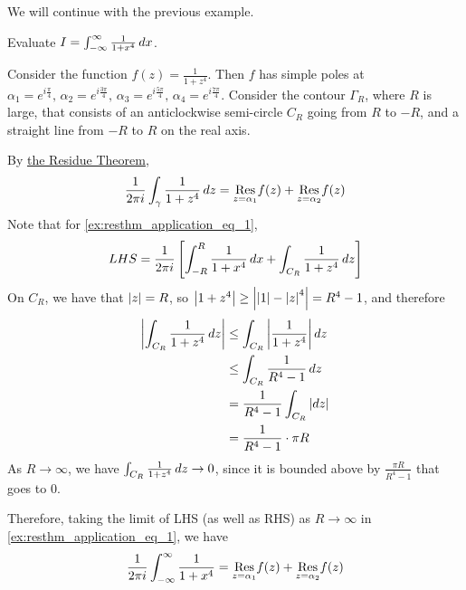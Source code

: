 \documentclass[notoc,notitlepage]{tufte-book}
\begin{document}
We will continue with the previous example.

\begin{ex}
  Evaluate $I = \int_{-\infty}^{\infty} \frac{1}{1 + x^4} \dif{x}$.

  Consider the function $f(z) = \frac{1}{1 + z^4}$. Then $f$ has simple poles at $\alpha_1 = e^{i \frac{\pi}{4} }, \, \alpha_2 = e^{i \frac{3 \pi}{4} }, \, \alpha_3 = e^{i \frac{5 \pi}{4} }, \, \alpha_4 = e^{i \frac{7 \pi}{4} }$. Consider the contour $\Gamma_R$, where $R$ is large, that consists of an anticlockwise semi-circle $C_R$ going from $R$ to $-R$, and a straight line from $-R$ to $R$ on the real axis.

  By \hyperref[thm:cauchy_s_residue_theorem_generalized]{the Residue Theorem},
  \begin{equation}\label{ex:resthm_application_eq_1}
    \frac{1}{2 \pi i} \int_{\gamma} \frac{1}{1 + z^4} \dif{z} = \res{f(z)}{z = \alpha_1} + \res{f(z)}{z = \alpha_2}
  \end{equation}
  Note that for \cref{ex:resthm_application_eq_1},
  \begin{equation*}
    LHS = \frac{1}{2 \pi i} \left[ \int_{-R}^{R} \frac{1}{1 + x^4} \dif{x} + \int_{C_R} \frac{1}{1 + z^4} \dif{z} \right] 
  \end{equation*}
  On $C_R$, we have that $\abs{z} = R$, so $\abs{1 + z^4} \geq \abs{\abs{1} - \abs{z}^4} = R^4 - 1$, and therefore
  \begin{align*}
    \abs{\int_{C_R} \frac{1}{1 + z^4} \dif{z} }
      &\leq \int_{C_R} \abs{\frac{1}{1 + z^4} } \dif{z} \\
      &\leq \int_{C_R} \frac{1}{R^4 - 1} \dif{z} \\
      &= \frac{1}{R^4 - 1} \int_{C_R} \abs{\dif{z}} \\
      &= \frac{1}{R^4 - 1} \cdot \pi R
  \end{align*}
  As $R \to \infty$, we have $\int_{C_R} \frac{1}{1 + z^4} \dif{z} \to 0$, since it is bounded above by $\frac{\pi R}{R^4 - 1}$ that goes to $0$.

  Therefore, taking the limit of LHS (as well as RHS) as $R \to \infty$ in \cref{ex:resthm_application_eq_1}, we have
  \begin{equation*}
    \frac{1}{2 \pi i} \int_{-\infty}^{\infty} \frac{1}{1 + x^4} = \res{f(z)}{z = \alpha_1} + \res{f(z)}{z = \alpha_2}
  \end{equation*}


\end{ex}
\end{document}
